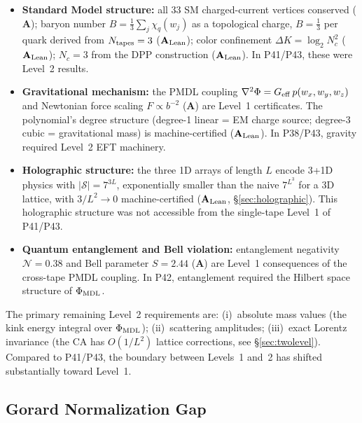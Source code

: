 \documentclass[11pt]{article}
\theoremstyle{remark}
\newcommand{\CatA}{\textbf{A}}
\newcommand{\CatAL}{\ensuremath{\textbf{A}_{\rm Lean}}}
\begin{document}
\begin{itemize}[noitemsep]
  \item \textbf{Standard Model structure:} all 33 SM charged-current vertices conserved ($\CatA$);
    baryon number $B=\frac{1}{3}\sum_j\chi_q(w_j)$ as a topological charge, $B=\frac{1}{3}$ per quark
    derived from $N_{\rm tapes}=3$ ($\CatAL$); color confinement $\Delta K=\log_2 N_c^2$ ($\CatAL$);
    $N_c=3$ from the DPP construction ($\CatAL$). In P41/P43, these were Level~2 results.

  \item \textbf{Gravitational mechanism:} the PMDL coupling $\nabla^2\Phi = G_{\rm eff}\,p(w_x,w_y,w_z)$
    and Newtonian force scaling $F\propto b^{-2}$ ($\CatA$) are Level~1 certificates.
    The polynomial's degree structure (degree-1 linear = EM charge source; degree-3 cubic = gravitational
    mass) is machine-certified ($\CatAL$). In P38/P43, gravity required Level~2 EFT machinery.

  \item \textbf{Holographic structure:} the three 1D arrays of length $L$ encode 3+1D physics with
    $|\mathcal{S}|=7^{3L}$, exponentially smaller than the naive $7^{L^3}$ for a 3D lattice, with
    $3/L^2\to 0$ machine-certified ($\CatAL$, \S\ref{sec:holographic}). This holographic
    structure was not accessible from the single-tape Level~1 of P41/P43.

  \item \textbf{Quantum entanglement and Bell violation:} entanglement negativity $\mathcal{N}=0.38$ and
    Bell parameter $S=2.44$ ($\CatA$) are Level~1 consequences of the cross-tape PMDL coupling.
    In P42, entanglement required the Hilbert space structure of $\Phi_{\rm MDL}$.
\end{itemize}

\noindent The primary remaining Level~2 requirements are: (i)~absolute mass values (the kink energy
integral over $\Phi_{\rm MDL}$); (ii)~scattering amplitudes; (iii)~exact Lorentz invariance
(the CA has $O(1/L^2)$ lattice corrections, see \S\ref{sec:twolevel}). Compared to P41/P43,
the boundary between Levels~1 and~2 has shifted substantially toward Level~1.

\subsection{Gorard Normalization Gap}
\end{document}
